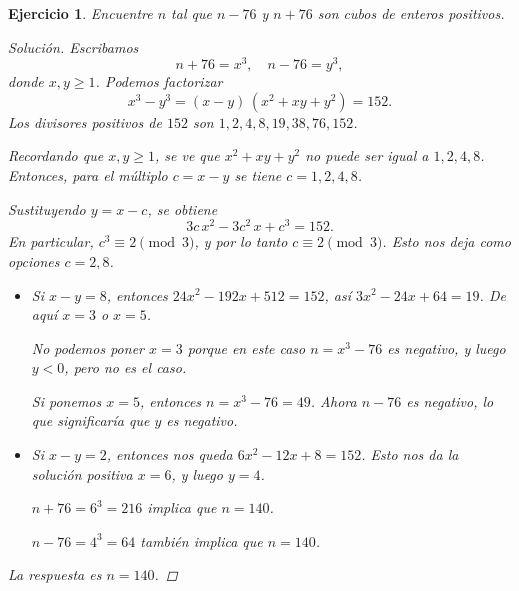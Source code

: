 \documentclass{article}
\theoremstyle{plain}
\newtheorem{ejercicio}{Ejercicio}
\newenvironment{solucion}{\begin{proof}[Solución]}{\end{proof}}
\begin{document}
\begin{ejercicio}
Encuentre $n$ tal que $n - 76$ y $n + 76$ son cubos de enteros positivos.

\ifdefined\solutions
\begin{solucion}
    Escribamos
    \[ n + 76 = x^3, \quad n - 76 = y^3, \]
    donde $x, y \ge 1$. Podemos factorizar
    \[ x^3 - y^3 = (x - y)\,(x^2 + xy + y^2) = 152. \]
    Los divisores positivos de $152$ son $1, 2, 4, 8, 19, 38, 76, 152$.

    Recordando que $x, y \ge 1$, se ve que $x^2 + xy + y^2$ no puede ser igual
    a $1, 2, 4, 8$. Entonces, para el múltiplo $c = x - y$ se tiene
    $c = 1, 2, 4, 8$.

    Sustituyendo $y = x - c$, se obtiene
    \[ 3c\,x^2 - 3c^2\,x + c^3 = 152. \]
    En particular, $c^3 \equiv 2 \pmod{3}$, y por lo tanto $c \equiv 2 \pmod{3}$.
    Esto nos deja como opciones $c = 2, 8$.

    \begin{itemize}
    \item Si $x - y = 8$, entonces $24x^2 - 192x + 512 = 152$, así
        $3x^2 - 24x + 64 = 19$. De aquí $x = 3$ o $x = 5$.
    
        No podemos poner $x = 3$ porque en este caso $n = x^3 - 76$ es negativo,
        y luego $y < 0$, pero no es el caso.

        Si ponemos $x = 5$, entonces $n = x^3 - 76 = 49$. Ahora $n - 76$
        es negativo, lo que significaría que $y$ es negativo.

    \item Si $x - y = 2$, entonces nos queda $6x^2 - 12x + 8 = 152$.
        Esto nos da la solución positiva $x = 6$, y luego $y = 4$.

        $n + 76 = 6^3 = 216$ implica que $n = 140$.

        $n - 76 = 4^3 = 64$ también implica que $n = 140$.
    \end{itemize}

    La respuesta es $n = 140$.
\end{solucion}
\fi
\end{ejercicio}

\pagebreak
\end{document}
